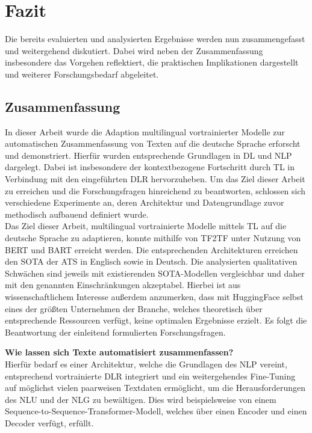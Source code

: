 \chapter{Fazit}
\thispagestyle{fancy}
\label{chap:Fazit}

\noindent
Die bereits evaluierten und analysierten Ergebnisse werden nun zusammengefasst und weitergehend diskutiert. Dabei wird neben der Zusammenfassung insbesondere das Vorgehen reflektiert, die praktischen Implikationen dargestellt und weiterer Forschungsbedarf abgeleitet.


\section{Zusammenfassung}
\noindent
In dieser Arbeit wurde die Adaption multilingual vortrainierter Modelle zur automatischen Zusammenfassung von Texten auf die deutsche Sprache erforscht und demonstriert. Hierfür wurden entsprechende Grundlagen in \ac{DL} und \ac{NLP} dargelegt. Dabei ist insbesondere der kontextbezogene Fortschritt durch \ac{TL} in Verbindung mit den eingeführten \ac{DLR} hervorzuheben. Um das Ziel dieser Arbeit zu erreichen und die Forschungsfragen hinreichend zu beantworten, schlossen sich verschiedene Experimente an, deren Architektur und Datengrundlage zuvor methodisch aufbauend definiert wurde.\\

\noindent
Das Ziel dieser Arbeit, multilingual vortrainierte Modelle mittels \ac{TL} auf die deutsche Sprache zu adaptieren, konnte mithilfe von \ac{TF2TF} unter Nutzung von \ac{BERT} und \ac{BART} erreicht werden. Die entsprechenden Architekturen erreichen den \ac{SOTA} der \ac{ATS} in Englisch sowie in Deutsch. Die analysierten qualitativen Schwächen sind jeweils mit existierenden \ac{SOTA}-Modellen vergleichbar und daher mit den genannten Einschränkungen akzeptabel. Hierbei ist aus wissenschaftlichem Interesse außerdem anzumerken, dass mit HuggingFace selbst eines der größten Unternehmen der Branche, welches theoretisch über entsprechende Ressourcen verfügt, keine optimalen Ergebnisse erzielt. Es folgt die Beantwortung der einleitend formulierten Forschungsfragen.
\newpage

\noindent
\textbf{Wie lassen sich Texte automatisiert zusammenfassen?}\\
\noindent
Hierfür bedarf es einer Architektur, welche die Grundlagen des \ac{NLP} vereint, entsprechend vortrainierte \ac{DLR} integriert und ein weitergehendes Fine-Tuning auf möglichst vielen paarweisen Textdaten ermöglicht, um die Herausforderungen des \ac{NLU} und der {NLG} zu bewältigen. Dies wird beispielsweise von einem Sequence-to-Sequence-Transformer-Modell, welches über einen Encoder und einen Decoder verfügt, erfüllt.\\

